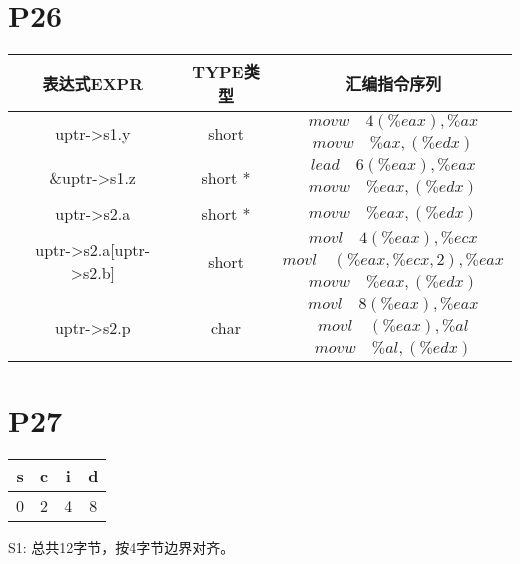 \documentclass{article}
\begin{document}
\section{P26}
\begin{table}[h]
	\begin{center} %
	  \begin{tabular}{c|c|c} %
		\textbf{表达式EXPR} & \textbf{TYPE类型} & \textbf{汇编指令序列}\\
		\hline
		\multirow{2}{*}{uptr->s1.y}  & \multirow{2}{*}{short} & $movw \quad 4(\% eax), \% ax$\\ 
		&&$movw \quad \% ax, (\% edx)$\\
		\hline
		\multirow{2}{*}{\&uptr->s1.z} & \multirow{2}{*}{short *} & $lead \quad 6(\%eax), \%eax$\\
		&&$movw \quad \%eax, (\% edx)$\\
		\hline
		uptr->s2.a & short * & $movw \quad \%eax, (\% edx)$\\
		\hline
		\multirow{3}{*}{uptr->s2.a[uptr->s2.b]} &\multirow{3}{*}{short} & $movl \quad 4(\% eax), \% ecx$\\
		&&$movl \quad (\% eax, \% ecx, 2), \% eax$\\
		&&$movw \quad \%eax, (\%edx)$\\
		\hline
		\multirow{3}{*}{uptr->s2.p} &\multirow{3}{*}{char} & $movl \quad 8(\% eax), \% eax$\\
		&&$movl \quad (\% eax), \% al$\\
		&&$movw \quad \%al, (\%edx)$\\
	\end{tabular}
	\end{center}
  \end{table}

\section{P27}
\begin{table}[h!]
	\begin{center}
	  \begin{tabular}{c|c|c|c} %
		s & c & i & d \\
		\hline
		0 & 2 & 4 & 8\\
	  \end{tabular}
	\end{center}
\end{table}
S1: 总共12字节，按4字节边界对齐。
\end{document}
